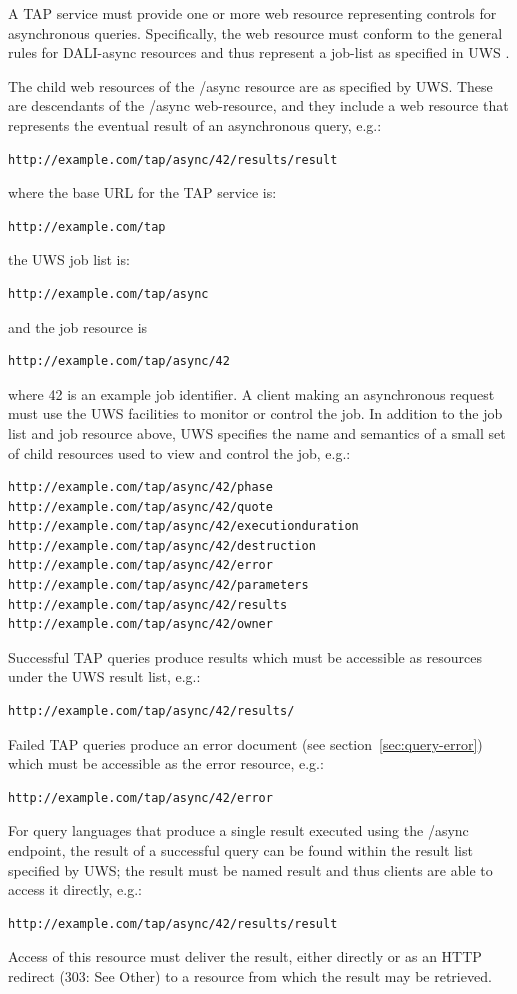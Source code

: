 \documentclass[11pt,letter]{ivoa}
\begin{document}
A TAP service must provide one or more web resource representing controls for 
asynchronous queries. Specifically, the web resource must conform to the general rules
for DALI-async resources and thus represent a job-list 
as specified in UWS \citep{2016ivoa.spec.1024H}.

The child web resources of the /async resource are as specified by UWS. These 
are descendants of the /async web-resource, and they include a web resource that 
represents the eventual result of an asynchronous query, e.g.:
\begin{verbatim}
http://example.com/tap/async/42/results/result
\end{verbatim}
where the base URL for the TAP service is:
\begin{verbatim}
http://example.com/tap
\end{verbatim}
the UWS job list is:
\begin{verbatim}
http://example.com/tap/async
\end{verbatim}
and the job resource is
\begin{verbatim}
http://example.com/tap/async/42
\end{verbatim}
where 42 is an example job identifier. A client making an asynchronous request 
must use 
the UWS facilities to monitor or control the job. In addition to the job list 
and job resource above, UWS specifies the name and semantics of a small set 
of child resources used to view and control the job, e.g.:
\begin{verbatim}
http://example.com/tap/async/42/phase
http://example.com/tap/async/42/quote
http://example.com/tap/async/42/executionduration
http://example.com/tap/async/42/destruction
http://example.com/tap/async/42/error
http://example.com/tap/async/42/parameters
http://example.com/tap/async/42/results
http://example.com/tap/async/42/owner
\end{verbatim}
Successful TAP queries produce results which must be accessible as  resources 
under the UWS result list, e.g.:
\begin{verbatim}
http://example.com/tap/async/42/results/
\end{verbatim}
Failed TAP queries produce an error document (see section~\ref{sec:query-error}) which must be accessible 
as the error resource, e.g.:
\begin{verbatim}
http://example.com/tap/async/42/error
\end{verbatim}
For query languages that produce a single result executed using the /async 
endpoint, the result of a successful query can be found within the result list 
specified by UWS; the result must be named result and thus 
clients are able to access it directly, e.g.:
\begin{verbatim}
http://example.com/tap/async/42/results/result
\end{verbatim}
Access of this resource must deliver the result, either directly or as an HTTP 
redirect (303: See Other) to a resource from which the result may be retrieved.
\end{document}

